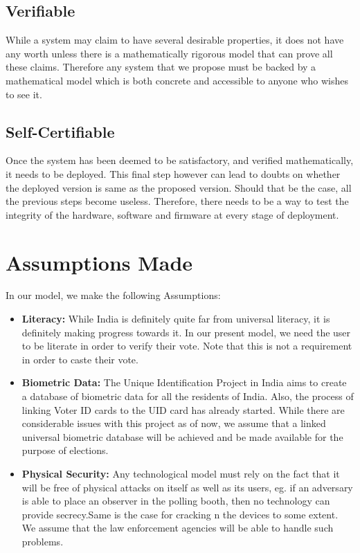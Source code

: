 \documentclass{article}
\begin{document}
\subsection{Verifiable}
While a system may claim to have several desirable properties, it does not have any worth unless there is a mathematically rigorous model that can prove all these claims. Therefore any system that we propose must be backed by a mathematical model which is both concrete and accessible to anyone who wishes to see it.
\subsection{Self-Certifiable}
Once the system has been deemed to be satisfactory, and verified mathematically, it needs to be deployed. This final step however can lead to doubts on whether the deployed version is same as the proposed version. Should that be the case, all the previous steps become useless. Therefore, there needs to be a way to test the integrity of the hardware, software and firmware at every stage of deployment.

\section{Assumptions Made}
In our model, we make the following Assumptions:
\begin{itemize}
    \item \textbf{Literacy: }While India is definitely quite far from universal literacy, it is definitely making progress towards it. In our present model, we need the user to be literate in order to verify their vote. Note that this is not a requirement in order to caste their vote.
    \item \textbf{Biometric Data: }The Unique Identification Project in India aims to create a database of biometric data for all the residents of India. Also, the process of linking Voter ID cards to the UID card has already started. While there are considerable issues with this project as of now, we assume that a linked universal biometric database will be achieved and be made available for the purpose of elections.
    \item \textbf{Physical Security: }Any technological model must rely on the fact that it will be free of physical attacks on itself as well as its users, eg. if an adversary is able to place an observer in the polling booth, then no technology can provide secrecy.Same is the case for cracking n the devices to some extent. We assume that the law enforcement agencies will be able to handle such problems.
    
\end{itemize}
\end{document}
